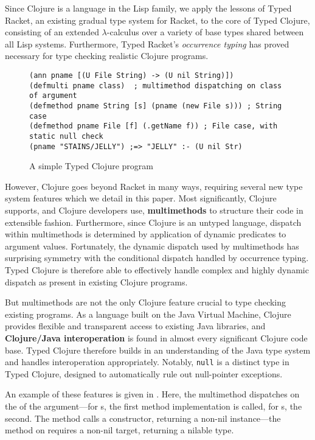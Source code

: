 Since Clojure is a language in the
Lisp family, we apply the lessons of Typed Racket, an existing gradual type
system for Racket, to the core of Typed Clojure, consisting of an extended
$\lambda$-calculus over a variety of base types shared between all Lisp systems.
%
Furthermore, Typed Racket's \emph{occurrence typing} has proved
necessary for type checking realistic Clojure programs.

\begin{figure*}[t!]
\begin{lstlisting}
(ann pname [(U File String) -> (U nil String)])
(defmulti pname class)  ; multimethod dispatching on class of argument
(defmethod pname String [s] (pname (new File s))) ; String case 
(defmethod pname File [f] (.getName f)) ; File case, with static null check
(pname "STAINS/JELLY") ;=> "JELLY" :- (U nil Str)
\end{lstlisting}
\caption{A simple Typed Clojure program}
\label{fig:ex1}
\end{figure*}


However, Clojure goes beyond Racket in many ways, requiring several
new type system features which we detail in this paper.
%
Most significantly, Clojure supports, and Clojure developers use,
\textbf{multimethods} to structure their code in extensible
fashion. Furthermore, since Clojure is an untyped language, dispatch
within multimethods is determined by application of dynamic predicates
to argument values. 
%
Fortunately, the dynamic dispatch used by multimethods has surprising
symmetry with the conditional dispatch handled by occurrence
typing. Typed Clojure is therefore able to effectively handle complex
and highly dynamic dispatch as present in existing Clojure programs. 

But multimethods are not the only Clojure feature crucial to type
checking existing programs. As a language built on the Java Virtual
Machine, Clojure provides flexible and transparent access to existing
Java libraries, and \textbf{Clojure/Java interoperation} is found in almost
every significant Clojure code base. Typed Clojure therefore builds in
an understanding of the Java type system and handles interoperation
appropriately. Notably, \texttt{null} is a distinct type in Typed Clojure,
designed to automatically rule out null-pointer exceptions.

An example of these features is given in
. Here, the  multimethod dispatches
on the  of the argument---for s,
the first method implementation is called, for s, the
second. The  method calls
a  constructor, returning a non-nil  instance---the 
 method 
on  requires a non-nil target, returning a nilable
type.  

